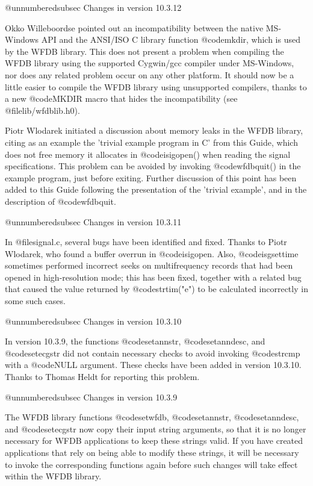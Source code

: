 @unnumberedsubsec Changes in version 10.3.12

Okko Willeboordse pointed out an incompatibility between the native
MS-Windows API and the ANSI/ISO C library function @code{mkdir}, which is
used by the WFDB library.  This does not present a problem when
compiling the WFDB library using the supported Cygwin/gcc compiler
under MS-Windows, nor does any related problem occur on any other
platform.  It should now be a little easier to compile the WFDB library
using unsupported compilers, thanks to a new @code{MKDIR} macro that hides
the incompatibility (see @file{lib/wfdblib.h0}).

Piotr Wlodarek initiated a discussion about memory leaks in the WFDB
library, citing as an example the 'trivial example program in C' from
this Guide, which does not free memory it allocates in @code{isigopen()}
when reading the signal specifications.  This problem can be avoided by
invoking @code{wfdbquit()} in the example program, just before exiting.
Further discussion of this point has been added to this Guide following
the presentation of the 'trivial example', and in the description of
@code{wfdbquit}.

@unnumberedsubsec Changes in version 10.3.11

In @file{signal.c}, several bugs have been identified and fixed.  Thanks
to Piotr Wlodarek, who found a buffer overrun in @code{isigopen}.  Also,
@code{isgsettime} sometimes performed incorrect seeks on multifrequency
records that had been opened in high-resolution mode;  this has been
fixed, together with a related bug that caused the value returned by
@code{strtim("e")} to be calculated incorrectly in some such cases.

@unnumberedsubsec Changes in version 10.3.10

In version 10.3.9, the functions @code{setannstr}, @code{setanndesc},
and @code{setecgstr} did not contain necessary checks to avoid invoking
@code{strcmp} with a @code{NULL} argument.  These checks have been added in
version 10.3.10.  Thanks to Thomas Heldt for reporting this problem.

@unnumberedsubsec Changes in version 10.3.9

The WFDB library functions @code{setwfdb}, @code{setannstr},
@code{setanndesc}, and @code{setecgstr} now copy their input string
arguments, so that it is no longer necessary for WFDB applications to
keep these strings valid.  If you have created applications that rely on
being able to modify these strings, it will be necessary to invoke the
corresponding functions again before such changes will take effect
within the WFDB library.

